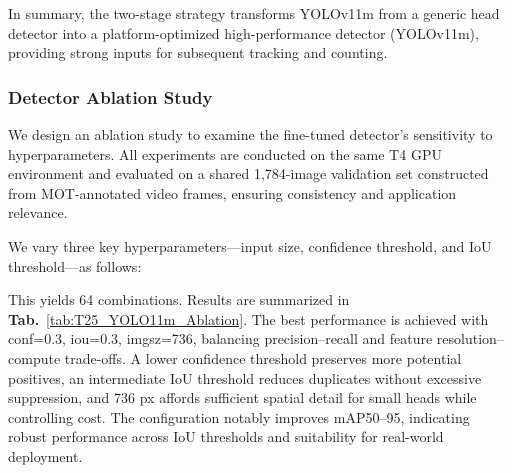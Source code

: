 \begin{table}[H]
\centering
{}
\caption{Fine-tuning Performance of YOLOv11m freeze=10 on the Labeled Head Dataset}
\label{tab:yolofreeze10_results}
\end{table}
In summary, the two-stage strategy transforms YOLOv11m from a generic head detector into a platform-optimized high-performance detector (YOLOv11m), providing strong inputs for subsequent tracking and counting.


\subsubsection{Detector Ablation Study}
We design an ablation study to examine the fine-tuned detector's sensitivity to hyperparameters. All experiments are conducted on the same T4 GPU environment and evaluated on a shared 1,784-image validation set constructed from MOT-annotated video frames, ensuring consistency and application relevance.

We vary three key hyperparameters—input size, confidence threshold, and IoU threshold—as follows:
\begin{table}[H]
    \centering
    \caption{Detector ablation parameters Setting}
    \label{Detector ablation parameters}
\end{table}
This yields 64 combinations. Results are summarized in \textbf{Tab.}~\ref{tab:T25_YOLO11m_Ablation}. The best performance is achieved with conf=0.3, iou=0.3, imgsz=736, balancing precision–recall and feature resolution–compute trade-offs. A lower confidence threshold preserves more potential positives, an intermediate IoU threshold reduces duplicates without excessive suppression, and 736 px affords sufficient spatial detail for small heads while controlling cost. The configuration notably improves mAP50–95, indicating robust performance across IoU thresholds and suitability for real-world deployment.


